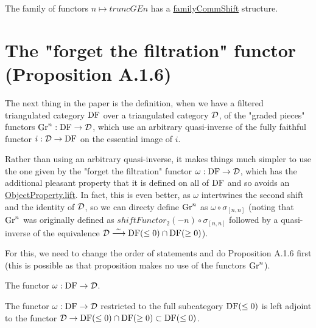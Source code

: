 \begin{definition}
\label{def-truncGE_commShift}
\leanok
{}

The family of functors $n \mapsto truncGE n$ has a \url{familyCommShift} structure.

\end{definition}


\section{The "forget the filtration" functor (Proposition A.1.6)}

The next thing in the paper is the definition, when we have a filtered triangulated category
$\operatorname{DF}$ over a triangulated category $\mathcal{D}$, of the "graded pieces" functors $\operatorname{Gr}^n : \operatorname{DF} \to \mathcal{D}$, 
which use an arbitrary quasi-inverse of the fully faithful functor $i:\mathcal{D}\to\operatorname{DF}$ on the essential image of
$i$.

Rather than using an arbitrary quasi-inverse, it makes things much simpler to use the one
given by the "forget the filtration" functor $\omega : \operatorname{DF} \to \mathcal{D}$, which has the
additional pleasant property that it is defined on all of $\operatorname{DF}$ and so avoids an
\url{ObjectProperty.lift}. In fact, this is even better, as $\omega$ intertwines the
second shift and the identity of $\mathcal{D}$, so we can directy define $\operatorname{Gr}^n$ as $\omega\circ\sigma_{[n,n]}$
(noting that $\operatorname{Gr}^n$ was originally defined as $shiftFunctor_2 (-n)\circ\sigma_{[n,n]}$ followed 
by a quasi-inverse of the equivalence $\mathcal{D}\stackrel{\sim}{\longrightarrow} \operatorname{DF}(\le 0)\cap\operatorname{DF}(\ge 0)$).

For this, we need to change the order of statements and do Proposition A.1.6 first (this is
possible as that proposition makes no use of the functors $\operatorname{Gr}^n$).


\begin{definition}
\label{def-FF}

The functor $\omega:\operatorname{DF}\to\mathcal{D}$.

\end{definition}

\begin{definition}
\label{def-FF-leftAdjoint}

The functor $\omega:\operatorname{DF}\to\mathcal{D}$ restricted to the full subcategory $\operatorname{DF}(\le 0)$ is left adjoint to 
the functor $\mathcal{D} \to \operatorname{DF}(\le 0)\cap\operatorname{DF}(\ge 0)\subset\operatorname{DF}(\le 0)$.

\end{definition}

